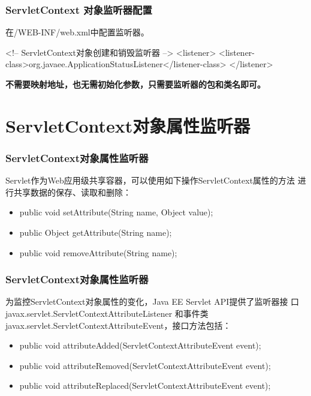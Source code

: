 \begin{frame}[fragile] %
\frametitle{ServletContext 对象监听器配置} 

在/WEB-INF/web.xml中配置监听器。

\begin{xmlCode}
<!-- ServletContext对象创建和销毁监听器 -->
<listener>  
  <listener-class>org.javaee.ApplicationStatusListener</listener-class>
</listener>  
\end{xmlCode}

{\bf\Red 不需要映射地址，也无需初始化参数，只需要监听器的包和类名即可。}
\end{frame}

\section{ServletContext对象属性监听器}

\begin{frame}[fragile] %
\frametitle{ServletContext对象属性监听器}


Servlet作为Web应用级共享容器，可以使用如下操作ServletContext属性的方法
进行共享数据的保存、读取和删除：

\begin{itemize}
\item public void setAttribute(String name, Object value);
\item public Object getAttribute(String name);
\item public void removeAttribute(String name);
\end{itemize}
\end{frame}

\begin{frame}[fragile] %
\frametitle{ServletContext对象属性监听器}

为监控ServletContext对象属性的变化，Java EE Servlet API提供了监听器接
口javax.servlet.ServletContextAttributeListener 和事件类
javax.servlet.ServletContextAttributeEvent，接口方法包括：

\begin{itemize}\small
\item public void attributeAdded(ServletContextAttributeEvent event);
\item public void attributeRemoved(ServletContextAttributeEvent
  event);
\item public void attributeReplaced(ServletContextAttributeEvent event);
\end{itemize}
\end{frame}

